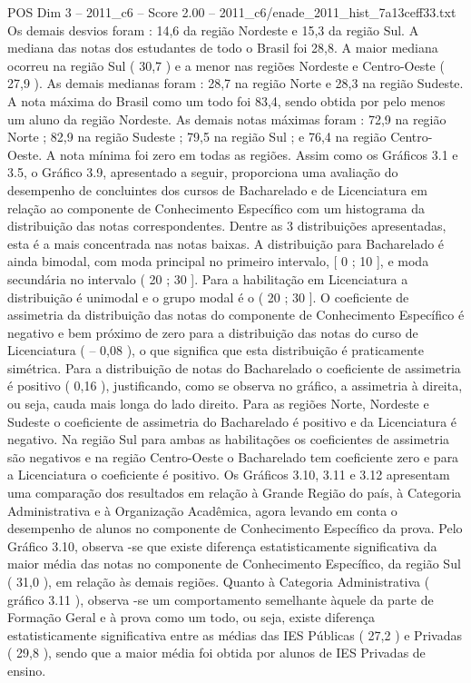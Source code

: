 \begin{textsample}{POS Dim 3 – 2011\_c6 – Score 2.00 – 2011\_c6/enade\_2011\_hist\_7a13ceff33.txt}
Os demais desvios foram : 14,6 da região Nordeste e 15,3 da região Sul.
A mediana das notas dos estudantes de todo o Brasil foi 28,8.
A maior mediana ocorreu na região Sul ( 30,7 ) e a menor nas regiões Nordeste e Centro-Oeste ( 27,9 ).
As demais medianas foram : 28,7 na região Norte e 28,3 na região Sudeste.
A nota máxima do Brasil como um todo foi 83,4, sendo obtida por pelo menos um aluno da região Nordeste.
As demais notas máximas foram : 72,9 na região Norte ; 82,9 na região Sudeste ; 79,5 na região Sul ; e 76,4 na região Centro-Oeste.
A nota mínima foi zero em todas as regiões.
Assim como os Gráficos 3.1 e 3.5, o Gráfico 3.9, apresentado a seguir, proporciona uma avaliação do desempenho de concluintes dos cursos de Bacharelado e de Licenciatura em relação ao componente de Conhecimento Específico com um histograma da distribuição das notas correspondentes.
Dentre as 3 distribuições apresentadas, esta é a mais concentrada nas notas baixas.
A distribuição para Bacharelado é ainda bimodal, com moda principal no primeiro intervalo, [ 0 ; 10 ], e moda secundária no intervalo ( 20 ; 30 ].
Para a habilitação em Licenciatura a distribuição é unimodal e o grupo modal é o ( 20 ; 30 ].
O coeficiente de assimetria da distribuição das notas do componente de Conhecimento Específico é negativo e bem próximo de zero para a distribuição das notas do curso de Licenciatura ( – 0,08 ), o que significa que esta distribuição é praticamente simétrica.
Para a distribuição de notas do Bacharelado o coeficiente de assimetria é positivo ( 0,16 ), justificando, como se observa no gráfico, a assimetria à direita, ou seja, cauda mais longa do lado direito.
Para as regiões Norte, Nordeste e Sudeste o coeficiente de assimetria do Bacharelado é positivo e da Licenciatura é negativo.
Na região Sul para ambas as habilitações os coeficientes de assimetria são negativos e na região Centro-Oeste o Bacharelado tem coeficiente zero e para a Licenciatura o coeficiente é positivo.
Os Gráficos 3.10, 3.11 e 3.12 apresentam uma comparação dos resultados em relação à Grande Região do país, à Categoria Administrativa e à Organização Acadêmica, agora levando em conta o desempenho de alunos no componente de Conhecimento Específico da prova.
Pelo Gráfico 3.10, observa -se que existe diferença estatisticamente significativa da maior média das notas no componente de Conhecimento Específico, da região Sul ( 31,0 ), em relação às demais regiões.
Quanto à Categoria Administrativa ( gráfico 3.11 ), observa -se um comportamento semelhante àquele da parte de Formação Geral e à prova como um todo, ou seja, existe diferença estatisticamente significativa entre as médias das IES Públicas ( 27,2 ) e Privadas ( 29,8 ), sendo que a maior média foi obtida por alunos de IES Privadas de ensino.

\end{textsample}
